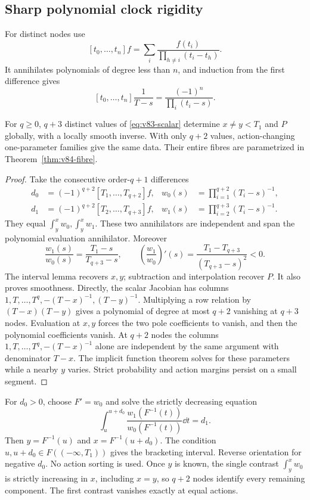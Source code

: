 \subsection{Sharp polynomial clock rigidity}
For distinct nodes use
\[
 [t_0,\ldots,t_n]f=\sum_i\frac{f(t_i)}{\prod_{h\ne i}(t_i-t_h)}.
\]
It annihilates polynomials of degree less than $n$, and induction from
the first difference gives
\begin{equation}\label{eq:v83-cauchy-dd}
 [t_0,\ldots,t_n]\frac1{T-s}=\frac{(-1)^n}{\prod_i(t_i-s)}.
\end{equation}
\begin{theorem}\label{thm:v83-scalar}
For $q\ge0$, $q+3$ distinct values of \eqref{eq:v83-scalar} determine
$x\ne y<T_1$ and $P$ globally, with a locally smooth inverse. With
only $q+2$ values, action-changing one-parameter families give the same
data. Their entire fibres are parametrized in
Theorem~\ref{thm:v84-fibre}.
\end{theorem}
\begin{proof}
Take the consecutive order-$q+1$ differences
\begin{align}
 d_0&=(-1)^{q+2}[T_1,\ldots,T_{q+2}]f,
 &w_0(s)&=\prod_{i=1}^{q+2}(T_i-s)^{-1},\label{eq:v83-contrasts}\\
 d_1&=(-1)^{q+2}[T_2,\ldots,T_{q+3}]f,
 &w_1(s)&=\prod_{i=2}^{q+3}(T_i-s)^{-1}.\nonumber
\end{align}
They equal $\int_y^xw_0,\int_y^xw_1$. These two annihilators are
independent and span the polynomial evaluation annihilator. Moreover
\begin{equation}\label{eq:v83-ratio}
 \frac{w_1(s)}{w_0(s)}=\frac{T_1-s}{T_{q+3}-s},\qquad
 \left(\frac{w_1}{w_0}\right)'(s)
 =\frac{T_1-T_{q+3}}{(T_{q+3}-s)^2}<0.
\end{equation}
The interval lemma recovers $x,y$; subtraction and interpolation recover
$P$. It also proves smoothness. Directly, the scalar Jacobian has
columns $1,T,\ldots,T^q,-(T-x)^{-1},(T-y)^{-1}$. Multiplying a row
relation by $(T-x)(T-y)$ gives a polynomial of degree at most $q+2$
vanishing at $q+3$ nodes. Evaluation at $x,y$ forces the two pole
coefficients to vanish, and then the polynomial coefficients vanish.
At $q+2$ nodes the columns $1,T,\ldots,T^q,-(T-x)^{-1}$ alone are
independent by the same argument with denominator $T-x$. The implicit
function theorem solves for these parameters while a nearby $y$ varies.
Strict probability and action margins persist on a small segment.
\end{proof}
For $d_0>0$, choose $F'=w_0$ and solve the strictly decreasing equation
\begin{equation}\label{eq:v83-monotone-solve}
 \int_u^{u+d_0}\frac{w_1(F^{-1}(t))}{w_0(F^{-1}(t))}\dd t=d_1.
\end{equation}
Then $y=F^{-1}(u)$ and $x=F^{-1}(u+d_0)$. The condition
$u,u+d_0\in F((-
\infty,T_1))$ gives the bracketing interval. Reverse orientation for
negative $d_0$. No action sorting is used. Once $y$ is known, the
single contrast $\int_y^xw_0$ is strictly increasing in $x$, including
$x=y$, so $q+2$ nodes identify every remaining component. The first
contrast vanishes exactly at equal actions.
